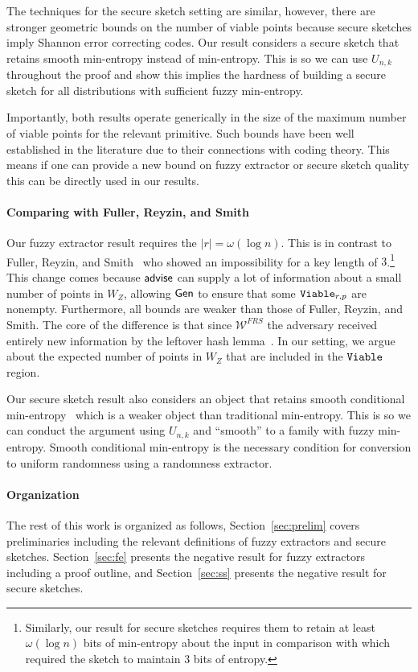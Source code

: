 The techniques for the secure sketch setting are similar, however, there are stronger geometric bounds on the number of viable points because secure sketches imply Shannon error correcting codes.  Our result considers a secure sketch that retains smooth min-entropy instead of min-entropy.  This is so we can use $U_{n,k}$ throughout the proof and show this implies the hardness of building a secure sketch for all distributions with sufficient fuzzy min-entropy.  

Importantly, both results operate generically in the size of the maximum number of viable points for the relevant primitive.  Such bounds have been well established in the literature due to their connections with coding theory.  This means if one can provide a new bound on fuzzy extractor or secure sketch quality this can be directly used in our results.


\paragraph{Comparing with Fuller, Reyzin, and Smith~\cite{fuller2020computational}}
Our fuzzy extractor result requires the $|r| = \omega(\log n)$.  This is in contrast to Fuller, Reyzin, and Smith~\cite{fuller2020computational} who showed an impossibility for a key length of $3$.\footnote{Similarly, our result for secure sketches requires them to retain at least $\omega(\log n)$ bits of min-entropy about the input in comparison with \cite{fuller2020computational} which required the sketch to maintain $3$ bits of entropy.} This change comes because ${\mathsf{advise}}$ can supply a lot of information about a small number of points in $W_Z$, allowing ${\mathsf{Gen}}$ to ensure that some $\mathtt{Viable}_{r,p}$ are nonempty. Furthermore, all bounds are weaker than those of Fuller, Reyzin, and Smith.  The core of the difference is that since $\mathcal{W}^{FRS}$ the adversary received entirely new information by the leftover hash lemma~\cite{haastad1993construction,barak2011leftover}. In our setting, we argue about the expected number of points in $W_Z$ that are included in the $\mathtt{Viable}$ region. 

Our secure sketch result also considers an object that retains smooth conditional min-entropy~\cite{renner2005simple} which is a weaker object than traditional min-entropy.  This is so we can conduct the argument using $U_{n,k}$ and ``smooth'' to a family with fuzzy min-entropy. Smooth conditional min-entropy is the necessary condition for conversion to uniform randomness using a randomness extractor. 



\paragraph{Organization} The rest of this work is organized as follows, Section~\ref{sec:prelim} covers preliminaries including the relevant definitions of fuzzy extractors and secure sketches.  Section~\ref{sec:fe} presents the negative result for fuzzy extractors including a proof outline, and Section~\ref{sec:ss} presents the negative result for secure sketches.


